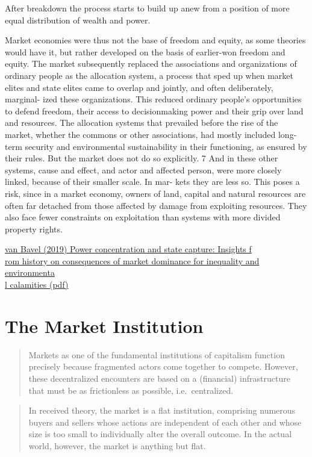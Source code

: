\documentclass[
]{book}
\begin{document}
After breakdown the process starts to build up anew from a position
of more equal distribution of wealth and power.

Market economies were thus not the
base of freedom and equity, as some theories
would have it, but rather developed on the
basis of earlier-won freedom and equity. The
market subsequently replaced the associations
and organizations of ordinary people as the
allocation system, a process that sped up when
market elites and state elites came to overlap
and jointly, and often deliberately, marginal-
ized these organizations. This reduced ordinary
people's opportunities to defend freedom, their
access to decisionmaking power and their grip
over land and resources.
The allocation systems that prevailed before
the rise of the market, whether the commons or
other associations, had mostly included long-
term security and environmental sustainability
in their functioning, as ensured by their rules.
But the market does not do so explicitly. 7 And
in these other systems, cause and effect, and
actor and affected person, were more closely
linked, because of their smaller scale. In mar-
kets they are less so. This poses a risk, since
in a market economy, owners of land, capital
and natural resources are often far detached
from those affected by damage from exploiting
resources. They also face fewer constraints on
exploitation than systems with more divided
property rights.

\href{pdf/van_Bavel_2019_HDR.pdf}{van Bavel (2019) Power concentration and state capture: Insights f\\
rom history on consequences of market dominance for inequality and environmenta\\
l calamities (pdf)}

\hypertarget{the-market-institution}{%
\section{The Market Institution}\label{the-market-institution}}

\begin{quote}
Markets as one of the fundamental institutions of capitalism function precisely because fragmented actors come together to compete. However, these decentralized encounters are based on a (financial) infrastructure that must be as frictionless as possible, i.e.~centralized.
\end{quote}

\begin{quote}
In received theory, the market is a flat institution, comprising
numerous buyers and sellers whose actions are independent of each other and whose size is
too small to individually alter the overall outcome.
In the actual world, however, the market is anything but flat.
\end{quote}
\end{document}
